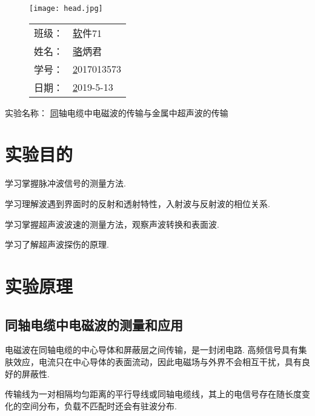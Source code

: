 \documentclass{thureport}
\newcommand{\major}{软件71}
\newcommand{\name}{骆炳君}
\newcommand{\stuid}{2017013573}
\newcommand{\newdate}{2019-5-13}
\newcommand{\newtitle}{同轴电缆中电磁波的传输与金属中超声波的传输}
\begin{document}
\thispagestyle{empty}
\begin{figure}[h]
	\begin{minipage}{0.65\linewidth}
		\centerline{\texttt{[image: head.jpg]}}
	\end{minipage}
	\hfill
	\begin{minipage}{.3\linewidth}
		\raggedleft
		\begin{tabular*}{.8\linewidth}{ll}
			班级： & \underline\major   \\
			姓名： & \underline\name    \\
			学号： & \underline\stuid   \\
			日期： & \underline\newdate
		\end{tabular*}
	\end{minipage}
\end{figure}
 
\begin{table}[!htbp]
	\centering\large
	实验名称： \underline\newtitle
\end{table}

\tableofcontents
\newpage

\section{实验目的}
\begin{clause}
	\item 学习掌握脉冲波信号的测量方法.
	\item 学习理解波遇到界面时的反射和透射特性，入射波与反射波的相位关系.
	\item 学习掌握超声波波速的测量方法，观察声波转换和表面波.
	\item 学习了解超声波探伤的原理.
\end{clause}

\section{实验原理}
\subsection{同轴电缆中电磁波的测量和应用}
电磁波在同轴电缆的中心导体和屏蔽层之间传输，是一封闭电路. 高频信号具有集肤效应，电流只在中心导体的表面流动，因此电磁场与外界不会相互干扰，具有良好的屏蔽性.

传输线为一对相隔均匀距离的平行导线或同轴电缆线，其上的电信号存在随长度变化的空间分布，负载不匹配时还会有驻波分布.
\end{document}
